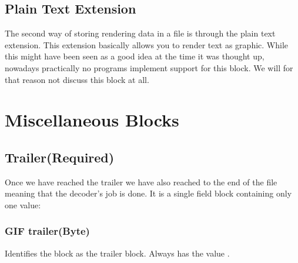 \begin{algorithm}[H]
\begin{algorithmic}[1]

    \State {}



    \EndIf
    \EndIf



    \EndWhile

  \end{algorithmic}
\end{algorithm}

\subsection{Plain Text Extension}

The second way of storing rendering data in a \gif file is through the
plain text extension. This extension basically allows you to render
text as graphic. While this might have been seen as a good idea at the
time it was thought up, nowadays practically no programs implement
support for this block. We will for that reason not discuss this
block at all.

\section{Miscellaneous Blocks}

\subsection{Trailer(Required)}

Once we have reached the trailer we have also reached to the end of
the \gif file meaning that the decoder's job is done. It is a single
field block containing only one value:

\subsubsection{GIF trailer(Byte)}

Identifies the block as the trailer block. Always has the value
.


